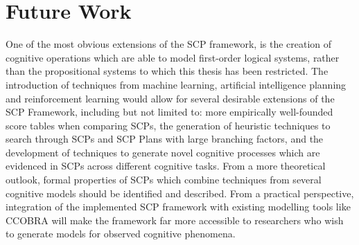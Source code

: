 \section{Future Work}

One of the most obvious extensions of the SCP framework, is the creation of cognitive operations which are able to model first-order logical systems, rather than the propositional systems to which this thesis has been restricted. The introduction of techniques from machine learning, artificial intelligence planning and reinforcement learning would allow for several desirable extensions of the SCP Framework, including but not limited to: more empirically well-founded score tables when comparing SCPs, the generation of heuristic techniques to search through SCPs and SCP Plans with large branching factors, and the development of techniques to generate novel cognitive processes which are evidenced in SCPs across different cognitive tasks. From a more theoretical outlook, formal properties of SCPs which combine techniques from several cognitive models should be identified and described. From a practical perspective, integration of the implemented SCP framework with existing modelling tools like CCOBRA will make the framework far more accessible to researchers who wish to generate models for observed cognitive phenomena. 
